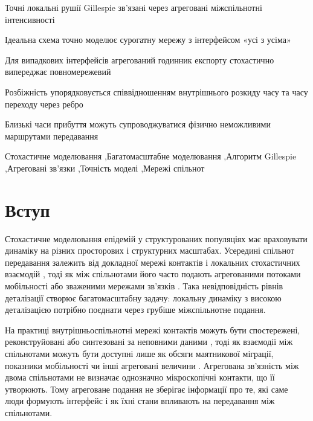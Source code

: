 \begin{highlights}
\item Точні локальні рушії Gillespie зв'язані через агреговані міжспільнотні інтенсивності
\item Ідеальна схема точно моделює сурогатну мережу з інтерфейсом «усі з усіма»
\item Для випадкових інтерфейсів агрегований годинник експорту стохастично випереджає повномережевий
\item Розбіжність упорядковується співвідношенням внутрішнього розкиду часу та часу переходу через ребро
\item Близькі часи прибуття можуть супроводжуватися фізично неможливими маршрутами передавання
\end{highlights}

\begin{keywords}
Стохастичне моделювання \sep Багатомасштабне моделювання \sep Алгоритм Gillespie \sep Агреговані зв'язки \sep Точність моделі \sep Мережі спільнот
\end{keywords}

\maketitle

\clearpage
\section{Вступ}
\label{sec:introduction}

Стохастичне моделювання епідемій у структурованих популяціях має враховувати динаміку на різних просторових і структурних масштабах. Усередині спільнот передавання залежить від докладної мережі контактів і локальних стохастичних взаємодій \citep{keeling2005,pastorsatorras2015,kiss2017}, тоді як між спільнотами його часто подають агрегованими потоками мобільності або зваженими мережами зв'язків \citep{balcan2009,barbosa2018human}. Така невідповідність рівнів деталізації створює багатомасштабну задачу: локальну динаміку з високою деталізацією потрібно поєднати через грубіше міжспільнотне подання.

На практиці внутрішньоспільнотні мережі контактів можуть бути спостережені, реконструйовані або синтезовані за неповними даними \citep{eubank2004,danon2011}, тоді як взаємодії між спільнотами можуть бути доступні лише як обсяги маятникової міграції, показники мобільності чи інші агреговані величини \citep{barbosa2018human,chang2021}. Агрегована зв'язність між двома спільнотами не визначає однозначно мікроскопічні контакти, що її утворюють. Тому агреговане подання не зберігає інформації про те, які саме люди формують інтерфейс і як їхні стани впливають на передавання між спільнотами.

